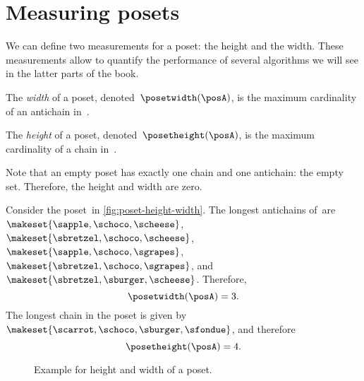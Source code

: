 
\section{Measuring posets}
We can define two measurements for a poset: the height and the width.
These measurements allow to quantify the performance of several algorithms we will see in the latter parts of the book.
\begin{definition}
    \label{def:poset-width}
    The \emph{width} of a poset, denoted~$\posetwidth(\posA)$, is the maximum cardinality of an antichain in~\posA.
\end{definition}

\begin{definition}
    \label{def:poset-height}
    The \emph{height} of a poset, denoted~$\posetheight(\posA)$, is the maximum cardinality of a chain in~\posA.
\end{definition}

Note that an empty poset has exactly one chain and one antichain: the empty set.
Therefore, the height and width are zero.

\begin{example}
    Consider the poset~\posA in \cref{fig:poset-height-width}.
    The longest antichains of~\posA are~$\makeset{\sapple, \schoco, \scheese}$, $\makeset{\sbretzel, \schoco, \scheese}$, $\makeset{\sapple, \schoco, \sgrapes}$, $\makeset{\sbretzel, \schoco, \sgrapes}$, and~$\makeset{\sbretzel, \sburger, \scheese}$.
    Therefore, $$\posetwidth(\posA)=3.$$
    The longest chain in the poset is given by~$\makeset{\scarrot,\schoco,\sburger,\sfondue}$, and therefore $$\posetheight(\posA)=4.$$
\end{example}

\begin{figure*}[h]
    \caption{Example for height and width of a poset.
    }
\end{figure*}


